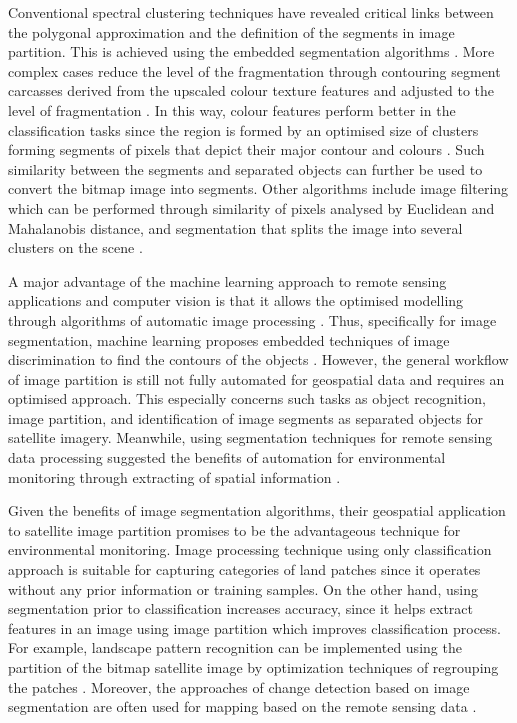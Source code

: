 \documentclass[analytics,article,submit,pdftex,moreauthors]{Definitions/mdpi}
\begin{document}
Conventional spectral clustering techniques have revealed critical links between the polygonal approximation and the definition of the segments in image partition. This is achieved using the embedded segmentation algorithms \cite{Saha,Pugazhenthi,Congetal2018}. More complex cases reduce the level of the fragmentation through contouring segment carcasses derived from the upscaled colour texture features and adjusted to the level of fragmentation \cite{1370344}. In this way, colour features perform better in the classification tasks since the region is formed by an optimised size of clusters forming segments of pixels that depict their major contour and colours \cite{1421832}. Such similarity between the segments and separated objects can further be used to convert the bitmap image into segments. Other algorithms include image filtering which can be performed through similarity of pixels analysed by Euclidean and Mahalanobis distance, and segmentation that splits the image into several clusters on the scene \cite{8302195,9302320,5432655}. 

A major advantage of the machine learning approach to remote sensing applications and computer vision is that it allows the optimised modelling through algorithms of automatic image processing \cite{Yamashita,OLIVEIRA2020111830,Bauer,Onishi}. Thus, specifically for image segmentation, machine learning proposes embedded techniques of image discrimination to find the contours of the objects \cite{10073848,8402497,9113204}. However, the general workflow of image partition is still not fully automated for geospatial data and requires an optimised approach. This especially concerns such tasks as object recognition, image partition, and identification of image segments as separated objects for satellite imagery. Meanwhile, using segmentation techniques for remote sensing data processing suggested the benefits of automation for environmental monitoring through extracting of spatial information \cite{Colwell}. 

Given the benefits of image segmentation algorithms, their geospatial application to satellite image partition promises to be the advantageous technique for environmental monitoring. Image processing technique using only classification approach is suitable for capturing categories of land patches since it operates without any prior information or training samples. On the other hand, using segmentation prior to classification increases accuracy, since it helps extract features in an image using image partition which improves classification process. For example, landscape pattern recognition can be implemented using the partition of the bitmap satellite image by optimization techniques of regrouping the patches \cite{Lietal2017}. Moreover, the approaches of change detection based on image segmentation are often used for mapping based on the remote sensing data \cite{LeiNandi}. 
\end{document}
